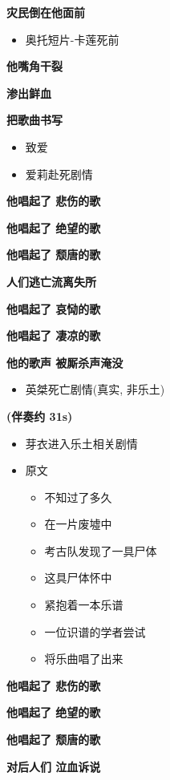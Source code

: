 \documentclass[a4paper]{article}
\begin{document}
\textbf{灾民倒在他面前}

\begin{itemize}
    \item 奥托短片-卡莲死前
\end{itemize}

\textbf{他嘴角干裂}

\textbf{渗出鲜血}

\textbf{把歌曲书写}

\begin{itemize}
    \item 致爱
    \item 爱莉赴死剧情
\end{itemize}

\textbf{他唱起了 悲伤的歌}

\textbf{他唱起了 绝望的歌}

\textbf{他唱起了 颓唐的歌}

\textbf{人们逃亡流离失所}

\textbf{他唱起了 哀恸的歌}

\textbf{他唱起了 凄凉的歌}

\textbf{他的歌声 被厮杀声淹没}

\begin{itemize}
    \item 英桀死亡剧情(真实, 非乐土)
\end{itemize}

\textbf{(伴奏约 31s)}

\begin{itemize}
    \item 芽衣进入乐土相关剧情
    \item 原文
    \begin{itemize}
        \item 不知过了多久
        \item 在一片废墟中
        \item 考古队发现了一具尸体
        \item 这具尸体怀中
        \item 紧抱着一本乐谱
        \item 一位识谱的学者尝试
        \item 将乐曲唱了出来
    \end{itemize}
\end{itemize}

\textbf{他唱起了 悲伤的歌}

\textbf{他唱起了 绝望的歌}

\textbf{他唱起了 颓唐的歌}

\textbf{对后人们 泣血诉说}
\end{document}
